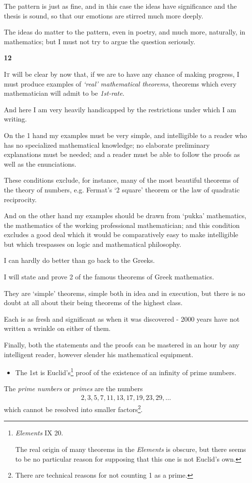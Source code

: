 \documentclass{article}
\numberwithin{equation}{section}
\begin{document}
The pattern is just as fine, and in this case the ideas have significance and the thesis is sound, so that our emotions are stirred much more deeply.

The ideas do matter to the pattern, even in poetry, and much more, naturally, in mathematics; but I must not try to argue the question seriously.

\begin{center}
    \large\textbf{12}
\end{center}
\textsc{It} will be clear by now that, if we are to have any chance of making progress, I must produce examples of \textit{`real' mathematical theorems}, theorems which every mathematician will admit to be \textit{1st-rate}.

And here I am very heavily handicapped by the restrictions under which I am writing.

On the 1 hand my examples must be very simple, and intelligible to a reader who has no specialized mathematical knowledge; no elaborate preliminary explanations must be needed; and a reader must be able to follow the proofs as well as the enunciations.

These conditions exclude, for instance, many of the most beautiful theorems of the theory of numbers, e.g. Fermat's `2 square' theorem or the law of quadratic reciprocity.

And on the other hand my examples should be drawn from `pukka' mathematics, the mathematics of the working professional mathematician; and this condition excludes a good deal which it would be comparatively easy to make intelligible but which trespasses on logic and mathematical philosophy.

%
I can hardly do better than go back to the Greeks.

I will state and prove 2 of the famous theorems of Greek mathematics.

They are `simple' theorems, simple both in idea and in execution, but there is no doubt at all about their being theorems of the highest class.

Each is as fresh and significant as when it was discovered - 2000 years have not written a wrinkle on either of them.

Finally, both the statements and the proofs can be mastered in an hour by any intelligent reader, however slender his mathematical equipment.
\begin{itemize}
    \item [1.] The 1st is Euclid's\footnote{\textit{Elements} IX 20.
    
    The real origin of many theorems in the \textit{Elements} is obscure, but there seems to be no particular reason for supposing that this one is not Euclid's own.} proof of the existence of an infinity of prime numbers.
\end{itemize}
The \textit{prime numbers} or \textit{primes} are the numbers
\begin{align}
    \label{A}
    \tag{A}
    2,3,5,7,11,13,17,19,23,29,\ldots
\end{align}
which cannot be resolved into smaller factors\footnote{There are technical reasons for not counting 1 as a prime.}.
\end{document}
